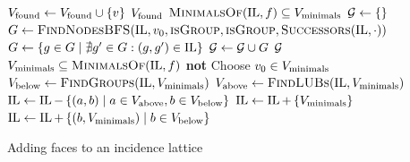 \begin{algorithm}[tbp]
\begin{algorithmic}[1]
                    \State $V_{\textnormal{found}} \gets V_{\textnormal{found}} \cup \left\{ v \right\}$
                \EndIf
            \EndWhile
            \State \Return $V_{\textnormal{found}}$
        \EndFunction
        \Statex
                \State \Return $\Call{MinimalsOf}{\IL, f} \subseteq V_{\textnormal{minimals}}$
            \EndFunction
            \State $\mathcal{G} \gets \left\{  \right\}$
                \State $G \gets \Call{FindNodesBFS}{\IL, v_0, \pred{isGroup}, \pred{isGroup}, \pred{Successors}(\IL, \cdot)}$
                \State $G \gets \left\{ g \in G \mid \nexists g^\prime \in G : (g, g^\prime) \in \operatorname{IL} \right\}$
                \State $\mathcal{G} \gets \mathcal{G} \cup G$
            \EndFor
            \State \Return $\mathcal{G}$
        \EndFunction
        \Statex
                \State \Return $V_{\textnormal{minimals}} \subseteq \Call{MinimalsOf}{\IL, f}$
            \EndFunction
                \State \Return \textbf{not} 
            \EndFunction
            \State Choose $v_0 \in V_{\textnormal{minimals}}$
            \State \Return {}
        \EndFunction
        \Statex
            \State $V_{\textnormal{below}} \gets \Call{FindGroups}{\IL, V_{\textnormal{minimals}}}$
            \State $V_{\textnormal{above}} \gets \Call{FindLUBs}{\IL, V_{\textnormal{minimals}}}$
            \Statex
            \State $\operatorname{IL} \gets \operatorname{IL} - \left\{ (a, b) \mid a \in V_{\textnormal{above}}, b \in V_{\textnormal{below}} \right\}$
            \State $\operatorname{IL} \gets \operatorname{IL} + \left\{ V_{\textnormal{minimals}} \right\}$
            \State $\operatorname{IL} \gets \operatorname{IL} + \left\{ (b, V_{\textnormal{minimals}}) \mid b \in V_{\textnormal{below}} \right\}$
        \EndProcedure
    \end{algorithmic}
    \caption{Adding faces to an incidence lattice}
    \label{alg:addface}
\end{algorithm}
